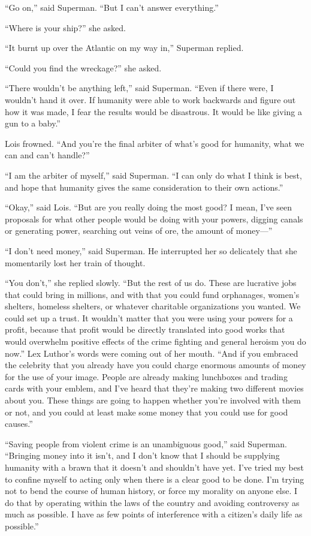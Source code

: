 ``Go on,'' said Superman. ``But I can't answer everything.''

``Where is your ship?'' she asked.

``It burnt up over the Atlantic on my way in,'' Superman replied.

``Could you find the wreckage?'' she asked.

``There wouldn't be anything left,'' said Superman. ``Even if there
were, I wouldn't hand it over. If humanity were able to work backwards
and figure out how it was made, I fear the results would be disastrous.
It would be like giving a gun to a baby.''

Lois frowned. ``And you're the final arbiter of what's good for
humanity, what we can and can't handle?''

``I am the arbiter of myself,'' said Superman. ``I can only do what I
think is best, and hope that humanity gives the same consideration to
their own actions.''

``Okay,'' said Lois. ``But are you really doing the most good? I mean,
I've seen proposals for what other people would be doing with your
powers, digging canals or generating power, searching out veins of ore,
the amount of money---''

``I don't need money,'' said Superman. He interrupted her so delicately
that she momentarily lost her train of thought.

``You don't,'' she replied slowly. ``But the rest of us do. These are
lucrative jobs that could bring in millions, and with that you could
fund orphanages, women's shelters, homeless shelters, or whatever
charitable organizations you wanted. We could set up a trust. It
wouldn't matter that you were using your powers for a profit, because
that profit would be directly translated into good works that would
overwhelm positive effects of the crime fighting and general heroism you
do now.'' Lex Luthor's words were coming out of her mouth. ``And if you
embraced the celebrity that you already have you could charge enormous
amounts of money for the use of your image. People are already making
lunchboxes and trading cards with your emblem, and I've heard that
they're making two different movies about you. These things are going to
happen whether you're involved with them or not, and you could at least
make some money that you could use for good causes.''

``Saving people from violent crime is an unambiguous good,'' said
Superman. ``Bringing money into it isn't, and I don't know that I should
be supplying humanity with a brawn that it doesn't and shouldn't have
yet. I've tried my best to confine myself to acting only when there is a
clear good to be done. I'm trying not to bend the course of human
history, or force my morality on anyone else. I do that by operating
within the laws of the country and avoiding controversy as much as
possible. I have as few points of interference with a citizen's daily
life as possible.''

